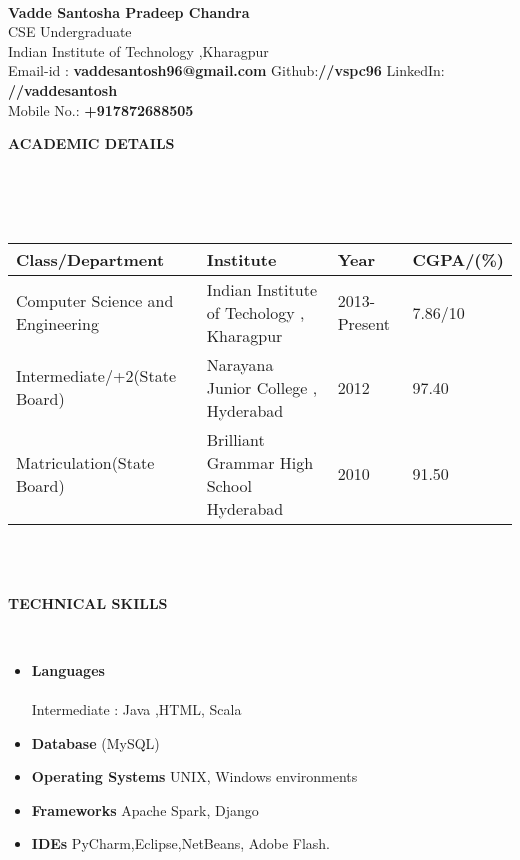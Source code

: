\documentclass[a4paper,10pt]{article}
\newcommand{\lsep}{-0.5cm}
\newcommand{\resheading}[1]{{\small \colorbox{mygrey}{\begin{minipage}{0.975\textwidth}{\textbf{#1 \vphantom{p\^{E}}}}\end{minipage}}}}
\begin{document}
\hspace{0.5cm}\\[-0.2cm]

\textbf{Vadde Santosha Pradeep Chandra} \\
\indent CSE Undergraduate\\
\indent Indian Institute of Technology ,Kharagpur \\
\indent Email-id : \textbf{vaddesantosh96@gmail.com} \indent Github:\textbf{//vspc96} \indent LinkedIn: \textbf{//vaddesantosh}\\\indent Mobile No.: \textbf{+917872688505} 

\resheading{\textbf{ACADEMIC DETAILS} }\\[\lsep]
\\ \\
\indent \begin{tabular}{ l @{\hskip 0.15in} l @{\hskip 0.15in} l @{\hskip 0.15in} l }
\hline
\textbf{Class/Department} & \textbf{Institute} & \textbf{Year} & \textbf{CGPA/(\%)} \\
\hline
Computer Science and Engineering &Indian Institute of Techology , Kharagpur & 2013-Present & 7.86/10 \\
Intermediate/+2(State Board) & Narayana Junior College , Hyderabad  & 2012 & 97.40 \\
Matriculation(State Board) & Brilliant Grammar High School Hyderabad & 2010 & 91.50 \\
\hline
\end{tabular}
\\ \\


\resheading{\textbf{TECHNICAL SKILLS} }\vspace{1cm}\\[\lsep]
\begin{minipage}[t]{0.5\textwidth}
\begin{itemize}
\item \noindent \textbf{Languages}\\
    \\
    Intermediate : Java ,HTML, Scala
\item\noindent\textbf{Database} (MySQL)
\end{itemize}
\end{minipage}
\begin{minipage}[t]{0.5\textwidth}
\begin{itemize}
\item\noindent\textbf{Operating Systems} UNIX, Windows environments
\item\noindent\textbf{Frameworks} Apache Spark, Django
\item\noindent\textbf{IDEs} PyCharm,Eclipse,NetBeans, Adobe Flash.
\end{itemize}
\end{minipage}
\end{document}
